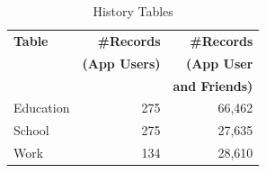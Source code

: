 \begin{table}
\centering
\caption{\small History Tables}
\label{tab:history}
\begin{tabular}{|>{\small}p{2cm}|>{\small}r|>{\small}r|}
\hline
\textbf{Table} & \textbf{\#Records} & \textbf{\#Records} \\
& \textbf{(App Users)} & \textbf{(App User} \\
& & \textbf{and Friends)} \\
\hline
Education & 275 & 66,462 \\
\hline
School & 275 & 27,635 \\
\hline
Work & 134 & 28,610 \\
\hline
\end{tabular}
\end{table}







